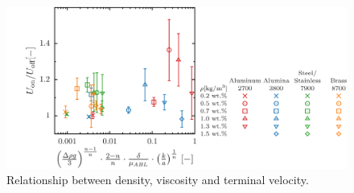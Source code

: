 \begin{figure}[ht]
    \centering
    \includegraphics[width=1.0\textwidth]{./5-Results/concentration/concentrationUdiffAll.png}
    \caption{Relationship between density, viscosity and terminal velocity.}
    \label{fig:concentrationUdiffAll}
\end{figure}